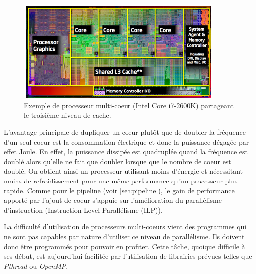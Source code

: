 \begin{figure}
    \center
    \includegraphics[width=10cm]{images/cpu_multicore.jpg}
    \caption{\label{processeur_archi} Exemple de processeur multi-coeur (Intel Core i7-2600K)  partageant le troisième niveau de cache.\protect\footnotemark}
\end{figure}





L’avantage principale de dupliquer un coeur plutôt que de doubler la fréquence d’un seul coeur est la consommation électrique et donc la puissance dégagée par effet Joule. En effet, la puissance dissipée est quadruplée quand la fréquence est doublé alors qu'elle ne fait que doubler lorsque que le nombre de coeur est doublé. On obtient ainsi un processeur utilisant moins d’énergie et nécessitant moins de refroidissement pour une même performance qu'un processeur plus rapide.
Comme pour le pipeline (voir \autoref{sec:pipeline}), le gain de performance apporté par l’ajout de coeur s’appuie sur l’amélioration du parallélisme d'instruction (Instruction Level Parallélisme (ILP)).

La difficulté d’utilisation de processeurs multi-coeurs vient des programmes qui ne sont pas capables par nature d’utiliser ce niveau de parallélisme. Ils doivent donc être programmés pour pouvoir en profiter. Cette tâche, quoique difficile à ses début, est aujourd'hui facilitée par l’utilisation de librairies prévues telles que \textit{Pthread} ou \textit{OpenMP}. 

